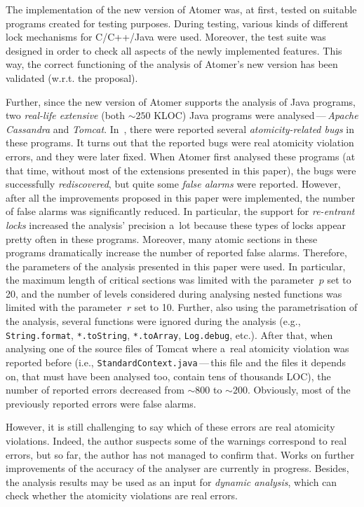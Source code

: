 \documentclass{ExcelAtFIT}
\theoremstyle{example}
\def\uv#1{\iflanguage{british}{``#1''}{\quotedblbase #1\textquotedblleft}}
\begin{document}
The implementation of the new version of Atomer was, at first, tested on suitable programs created for testing purposes. During testing, various kinds of different lock mechanisms for C/C++/Java were used. Moreover, the test suite was designed in order to check all aspects of the newly implemented features. This way, the correct functioning of the analysis of Atomer's new version has been validated (w.r.t. the proposal).

Further, since the new version of Atomer supports the analysis of Java programs, two \emph{real-life extensive} (both $ \sim\!250 $ KLOC) Java programs were analysed\,---\,\emph{Apache Cassandra} and \emph{Tomcat}. In~\cite{contracts2017}, there were reported several \emph{atomicity-related bugs} in these programs. It turns out that the reported bugs were real atomicity violation errors, and they were later fixed. When Atomer first analysed these programs (at that time, without most of the extensions presented in this paper), the bugs were successfully \emph{rediscovered}, but quite some \emph{false alarms} were reported. However, after all the improvements proposed in this paper were implemented, the number of false alarms was significantly reduced. In particular, the support for \emph{re-entrant locks} increased the analysis' precision a~lot because these types of locks appear pretty often in these programs. Moreover, many \uv{large} atomic sections in these programs dramatically increase the number of reported false alarms. Therefore, the parameters of the analysis presented in this paper were used. In particular, the maximum length of critical sections was limited with the parameter~$ p $ set to 20, and the number of levels considered during analysing nested functions was limited with the parameter~$ r $ set to 10. Further, also using the parametrisation of the analysis, several \uv{non-critical} functions were ignored during the analysis (e.g., \texttt{String.format}, \texttt{*.toString}, \texttt{*.toArray}, \texttt{Log.debug}, etc.). After that, when analysing one of the source files of Tomcat where a~real atomicity violation was reported before (i.e., \texttt{StandardContext.java}\,---\,this file and the files it depends on, that must have been analysed too, contain tens of thousands LOC), the number of reported errors decreased from $ \sim\!800 $ to $ \sim\!200 $. Obviously, most of the previously reported errors were false alarms.

However, it is still challenging to say which of these errors are real atomicity violations. Indeed, the author suspects some of the warnings correspond to real errors, but so far, the author has not managed to confirm that. Works on further improvements of the accuracy of the analyser are currently in progress. Besides, the analysis results may be used as an input for \emph{dynamic analysis}, which can check whether the atomicity violations are real errors.
\end{document}
